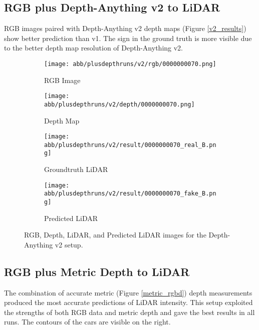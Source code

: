\subsection{RGB plus Depth-Anything v2 to LiDAR}
RGB images paired with Depth-Anything v2 depth maps (Figure \ref{v2_results}) show better prediction than v1. The sign in the ground  truth is more visible due to the better depth map resolution of Depth-Anything v2.
\begin{figure}[!ht]
	\centering
	\begin{subfigure}{0.4\textwidth}
		\centering
		\texttt{[image: abb/plusdepthruns/v2/rgb/0000000070.png]}
		\caption{RGB Image}
		\label{fig:v2_rgb}
	\end{subfigure}
	
	\vspace{1em} 
	
	\begin{subfigure}{0.4\textwidth}
		\centering
		\texttt{[image: abb/plusdepthruns/v2/depth/0000000070.png]}
		\caption{Depth Map}
		\label{fig:v2_depth}
	\end{subfigure}
	
	\vspace{1em} 
	\begin{subfigure}{0.25\textwidth}
		\centering
		\texttt{[image: abb/plusdepthruns/v2/result/0000000070\_real\_B.png]}
		\caption{Groundtruth LiDAR}
		\label{fig:v2_pred_lidar}
	\end{subfigure}
	\begin{subfigure}{0.25\textwidth}
		\centering
		\texttt{[image: abb/plusdepthruns/v2/result/0000000070\_fake\_B.png]}
		\caption{Predicted LiDAR}
		\label{v2}
	\end{subfigure}
	
	\caption{RGB, Depth, LiDAR, and Predicted LiDAR images for the Depth-Anything v2 setup.}
	\label{v2_rgbd}
\end{figure}
\subsection{RGB plus Metric Depth to LiDAR}

The combination of accurate metric (Figure \ref{metric_rgbd}) depth measurements produced the most accurate predictions of LiDAR intensity. This setup exploited the strengths of both RGB data and metric depth and gave the best results in all runs. The contours of the cars are visible on the right. 


